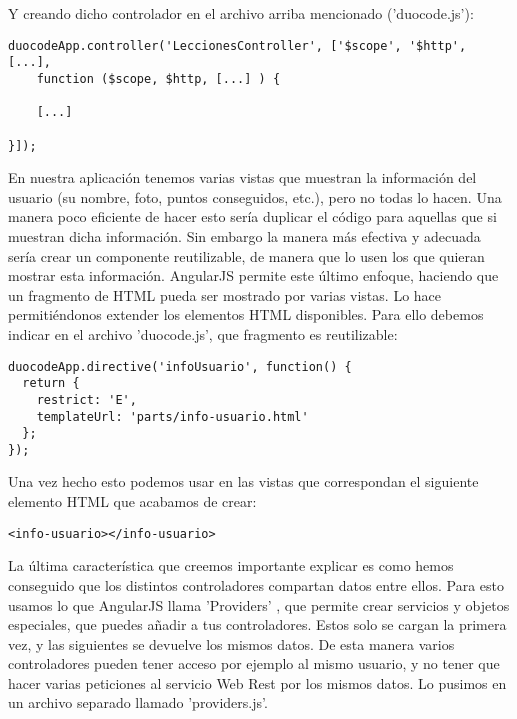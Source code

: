 Y creando dicho controlador en el archivo arriba mencionado ('duocode.js'):

\vspace{1em}
{\codesize
\lstset{}
\begin{lstlisting}[frame=single]
duocodeApp.controller('LeccionesController', ['$scope', '$http', [...], 
    function ($scope, $http, [...] ) {
    
	[...] 

}]);
\end{lstlisting}
}
\vspace{1em}

En nuestra aplicación tenemos varias vistas que muestran la información del usuario (su nombre, foto, puntos conseguidos, etc.), pero no todas lo hacen. Una manera poco eficiente de hacer esto sería duplicar el código para aquellas que si muestran dicha información. Sin embargo la manera más efectiva y adecuada sería crear un componente reutilizable, de manera que lo usen los que quieran mostrar esta información. AngularJS permite este último enfoque, haciendo que un fragmento de HTML pueda ser mostrado por varias vistas. Lo hace permitiéndonos extender los elementos HTML disponibles. Para ello debemos indicar en el archivo 'duocode.js', que fragmento es reutilizable: 

\vspace{1em}
{\codesize
\lstset{}
\begin{lstlisting}[frame=single]
duocodeApp.directive('infoUsuario', function() {
  return {
    restrict: 'E',
    templateUrl: 'parts/info-usuario.html'
  };
});
\end{lstlisting}
}
\vspace{1em}

Una vez hecho esto podemos usar en las vistas que correspondan el siguiente elemento HTML que acabamos de crear:

{\codesize
\begin{verbatim}
<info-usuario></info-usuario>
\end{verbatim}
}

La última característica que creemos importante explicar es como hemos conseguido que los distintos controladores compartan datos entre ellos. Para esto usamos lo que AngularJS llama 'Providers' \cite{providers}, que permite crear servicios y objetos especiales, que puedes añadir a tus controladores. Estos solo se cargan la primera vez, y las siguientes se devuelve los mismos datos. De esta manera varios controladores pueden tener acceso por ejemplo al mismo usuario, y no tener que hacer varias peticiones al servicio Web Rest por los mismos datos. Lo pusimos en un archivo separado llamado 'providers.js'.

